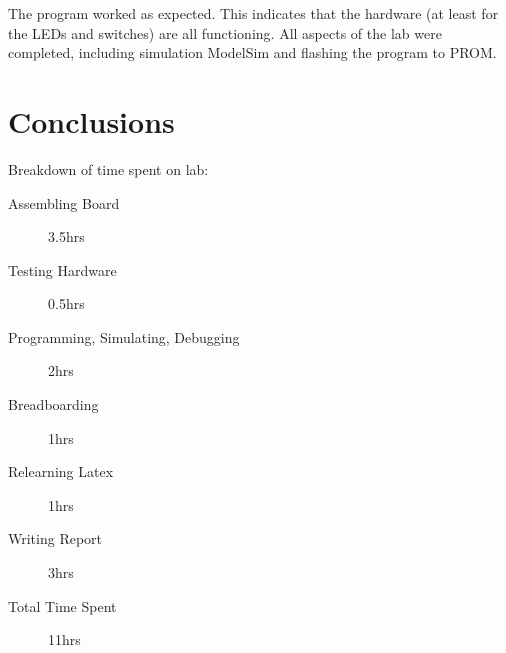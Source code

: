 \documentclass[11pt]{article}
\begin{document}
The program worked as expected. This indicates that the hardware (at least for the LEDs and switches) are all functioning. All aspects of the lab were completed, including simulation ModelSim and flashing the program to PROM. 



\section{Conclusions}

Breakdown of time spent on lab:
\begin{description}
	\item[Assembling Board] 3.5hrs
	\item[Testing Hardware] 0.5hrs
	\item[Programming, Simulating, Debugging] 2hrs
	\item[Breadboarding] 1hrs
	\item[Relearning Latex] 1hrs
	\item[Writing Report] 3hrs
	\item[Total Time Spent] 11hrs
\end{description}
\end{document}
